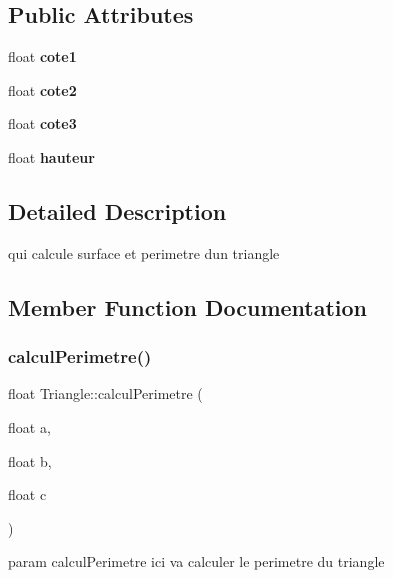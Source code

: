 \subsection*{Public Attributes}
\begin{DoxyCompactItemize}
\item 
\mbox{\label{classTriangle_a11345292059387564112d3b7267bfad5}} 
float {\bfseries cote1}
\item 
\mbox{\label{classTriangle_a5111045d46caaac8295a17ef499d4e75}} 
float {\bfseries cote2}
\item 
\mbox{\label{classTriangle_a9d7c379bf68c5bf62461de936dc5776b}} 
float {\bfseries cote3}
\item 
\mbox{\label{classTriangle_a329b79974da202a0bba86ba1f6ce0a96}} 
float {\bfseries hauteur}
\end{DoxyCompactItemize}


\subsection{Detailed Description}
qui calcule surface et perimetre d\textquotesingle{}un triangle 

\subsection{Member Function Documentation}
\mbox{\label{classTriangle_afeb2eb1920e4a0d0f376c32b7797e766}} 
\subsubsection{\texorpdfstring{calcul\+Perimetre()}{calculPerimetre()}}
{\footnotesize\ttfamily float Triangle\+::calcul\+Perimetre (\begin{DoxyParamCaption}\item[{float}]{a,  }\item[{float}]{b,  }\item[{float}]{c }\end{DoxyParamCaption})}

param calcul\+Perimetre ici va calculer le perimetre du triangle \mbox{\label{classTriangle_abf1ce3d4215d2f66f7030a569634a40a}} 
